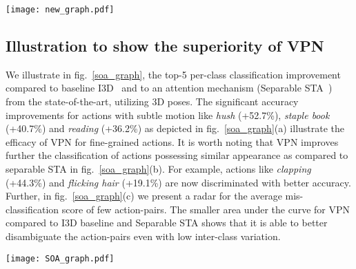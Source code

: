 \documentclass[runningheads]{llncs}
\begin{document}
\begin{figure*}
\centering
\texttt{[image: new\_graph.pdf]}
\caption{Graphs illustrating the superiority of each component of VPN compared to their counterparts (without the respective components). We present the Top-5 per class improvement for (a) VPN with embedding vs without embedding (only Spaital Attention), (b) VPN with GCN vs LSTM Pose Backbone, and (c) attention in VPN with vs without spatio-temporal coupler.}\vspace{-1em}
\label{module_graph}
\end{figure*}
\subsection{Illustration to show the superiority of VPN}
We illustrate in fig.~\ref{soa_graph}, the top-5 per-class classification improvement compared to baseline I3D~\cite{i3d} and to an attention mechanism (Separable STA~\cite{STA_iccv}) from the state-of-the-art, utilizing 3D poses. The significant accuracy improvements for actions with subtle motion like \textit{hush} (+52.7\%), \textit{staple book} (+40.7\%) and \textit{reading} (+36.2\%) as depicted in fig.~\ref{soa_graph}{ {(a)}} illustrate the efficacy of VPN for fine-grained actions. It is worth noting that VPN improves further the classification of actions possessing similar appearance as compared to separable STA in fig.~\ref{soa_graph}{ {(b)}}. For example, actions like \textit{clapping} (+44.3\%) and \textit{flicking hair} (+19.1\%) are now discriminated with better accuracy. Further, in fig.~\ref{soa_graph}{ {(c)}} we present a radar for the average mis-classification score of few action-pairs. The smaller area under the curve for VPN compared to I3D baseline and Separable STA shows that it is able to better disambiguate the action-pairs even with low inter-class variation.
\begin{figure*}
\centering
\texttt{[image: SOA\_graph.pdf]}
\caption{Graphs illustrating the superiority of VPN compared to the state-of-the-art methods. We present the Top-5 per class improvement for VPN over (a) I3D baseline and (b) Separable STA. In (c), we present a radar for the average mis-classification score of few action-pairs: lower scores indicate lesser ambiguities between the action-pairs. }\vspace{-1em}
\label{soa_graph}
\end{figure*}
\end{document}
